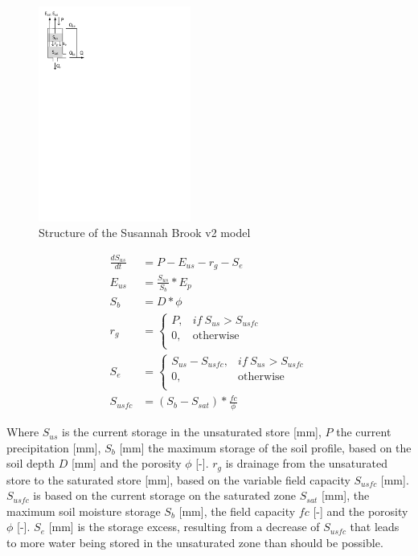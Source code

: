 { 																	%
\begin{figure}
\includegraphics[trim=1cm 21cm 14cm 0.8cm,width=5cm,keepaspectratio]{./AppA_files/10_schematic.pdf}
\caption{Structure of the Susannah Brook v2 model} \label{fig:10_schematic}
\end{figure}

\begin{align}
	\frac{dS_{us}}{dt} &= P-E_{us}-r_g -S_e\\
	E_{us} &= \frac{S_{us}}{S_b}*E_p\\
	S_b &= D*\phi\\
	r_g &= 
	\begin{cases}
		P, & if~S_{us} > S_{usfc}\\
		0, & \text{otherwise} \\
	\end{cases} \\
	S_e &= \begin{cases}
			S_{us} - S_{usfc}, & if~S_{us} > S_{usfc}\\
			0, & \text{otherwise} \\
			\end{cases}\\
	S_{usfc} &= (S_b - S_{sat})*\frac{fc}{\phi} 
\end{align}

Where $S_{us}$ is the current storage in the unsaturated store [mm], $P$ the current precipitation [mm], $S_b$ [mm] the maximum storage of the soil profile, based on the soil depth $D$ [mm] and the porosity $\phi$ [-]. $r_g$ is drainage from the unsaturated store to the saturated store [mm], based on the variable field capacity $S_{usfc}$ [mm]. $S_{usfc}$ is based on the current storage on the saturated zone $S_{sat}$ [mm], the maximum soil moisture storage $S_b$ [mm], the field capacity $fc$ [-] and the porosity $\phi$ [-]. $S_e$ [mm] is the storage excess, resulting from a decrease of $S_{usfc}$ that leads to more water being stored in the unsaturated zone than should be possible.

} %

